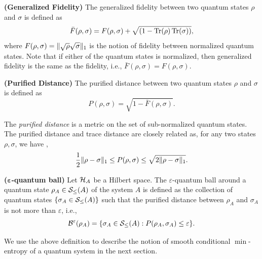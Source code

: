 \begin{definition}\textbf{(Generalized Fidelity)} The generalized fidelity between two quantum states $\rho$ and $\sigma$ is defined as
\[\bar{F}(\rho,\sigma) = F(\rho,\sigma) + \sqrt{(1-\operatorname{Tr}(\rho)\operatorname{Tr}(\sigma))},\]
where $F(\rho,\sigma) = \lVert\sqrt{\rho}\sqrt{\sigma}\rVert_1$ is the notion of fidelity between normalized quantum states. Note that if either of the quantum states is normalized, then generalized fidelity is the same as the fidelity, i.e., $\bar{F}(\rho,\sigma) = F(\rho,\sigma)$. 
\end{definition}

\begin{definition}\textbf{(Purified Distance)} The purified distance between two quantum states $\rho$ and $\sigma$ is defined as 
\[P(\rho,\sigma) = \sqrt{1-\bar{F}(\rho,\sigma)}.\]
\end{definition}
The \textit{purified distance} is a metric on the set of sub-normalized quantum states. The purified distance and trace distance are closely related as, for any two states $\rho,\sigma$, we have \cite{tomamichel2012framework},
\[\frac{1}{2}\lVert\rho-\sigma\rVert_1 \leq P(\rho,\sigma) \leq \sqrt{2\lVert\rho-\sigma\rVert_1}.\] 

\begin{definition}\textbf{($\boldsymbol{\varepsilon}$-quantum ball)} Let $\mathcal{H}_A$ be a Hilbert space. The $\varepsilon$-quantum ball around a quantum state $\rho_A \in \mathcal{S}_{\leq}(A)$ of the system $A$ is defined as the collection of quantum states $\{\sigma_A \in \mathcal{S}_{\leq}(A)\}$ such that the purified distance between $\rho_A$ and $\sigma_A$ is not more than $\varepsilon$, i.e.,
\[\mathcal{B}^{\varepsilon}(\rho_A) = \{\sigma_A \in \mathcal{S}_{\leq}(A) : P(\rho_A,\sigma_A) \leq \varepsilon\}.\]
\end{definition}
We use the above definition to describe the notion of smooth conditional $\min$-entropy of a quantum system in the next section.

